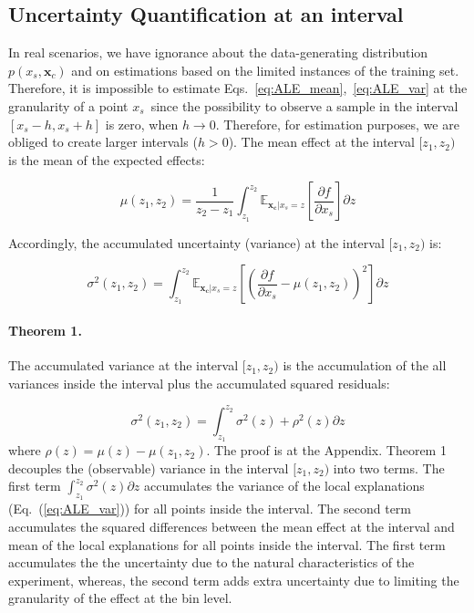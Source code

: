 \documentclass[twoside]{article}
\newcommand{\xc}{\mathbf{x_c}}
\begin{document}
\subsection{Uncertainty Quantification at an interval}

In real scenarios, we have ignorance about the data-generating
distribution \(p(x_s, \mathbf{x}_c)\) and on estimations based on the
limited instances of the training set. Therefore, it is impossible to
estimate Eqs.~\eqref{eq:ALE_mean},~\eqref{eq:ALE_var} at the
granularity of a point \(x_s\)\, since the possibility to observe a
sample in the interval \([x_s - h, x_s + h]\) is zero, when
\(h \to 0\). Therefore, for estimation purposes, we are obliged to
create larger intervals (\(h>0\)). The mean effect at the interval
\([z_1, z_2)\) is the mean of the expected effects:

\begin{equation}
  \label{eq:mu_bin}
  \mu(z_1, z_2) = \frac{1}{z_2 - z_1} \int_{z_1}^{z_2}
  \mathbb{E}_{\xc|x_s=z}\left [\frac{\partial f}{\partial x_s} \right ] \partial z
\end{equation}

\noindent
Accordingly, the accumulated uncertainty (variance) at the interval
\([z_1, z_2)\) is:

\begin{equation}
  \label{eq:var_bin}
  \sigma^2(z_1, z_2) = \int_{z_1}^{z_2}
  \mathbb{E}_{\xc|x_s=z} \left [ (\frac{\partial
      f}{\partial x_s} - \mu(z_1, z_2) )^2 \right] \partial z
\end{equation}

\noindent

\paragraph{Theorem 1.}

The accumulated variance at the interval \([z_1, z_2)\) is the
accumulation of the all variances inside the interval plus the
accumulated squared residuals:

\begin{equation}
 \sigma^2(z_1, z_2) = \int_{z_1}^{z_2} \sigma^2(z) + \rho^2(z) \partial z
\end{equation}
%
where \(\rho(z) = \mu(z) - \mu(z_1, z_2)\). The proof is at the
Appendix. Theorem 1 decouples the (observable) variance in the
interval \([z_1, z_2)\) into two terms. The first term
\(\int_{z_1}^{z_2} \sigma^2(z) \partial z\) accumulates the variance
of the local explanations (Eq.~(\ref{eq:ALE_var})) for all points
inside the interval. The second term accumulates the squared
differences between the mean effect at the interval and mean of the
local explanations for all points inside the interval. The first term
accumulates the the uncertainty due to the natural characteristics of
the experiment, whereas, the second term adds extra uncertainty due to
limiting the granularity of the effect at the bin level.
\end{document}

